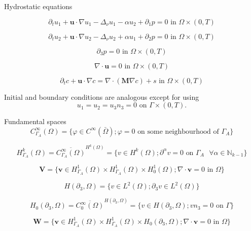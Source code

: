 \documentclass{beamer}
\begin{document}
\begin{frame}{Hydrostatic equations}

$$\partial_t u_1 + \mathbf{u} \cdot \nabla u_1 - \Delta_\nu u_1 - \alpha u_2 + \partial_1 p = 0 \text{ in } \Omega \times (0,T) $$

$$ \partial_t u_2 + \mathbf{u} \cdot \nabla u_2 - \Delta_\nu u_2 + \alpha u_1 + \partial_2 p = 0 \text{ in } \Omega \times (0,T) $$

$$ \partial_3 p = 0 \text{ in } \Omega \times (0,T) $$

$$ \nabla \cdot \mathbf{u} = 0 \text{ in } \Omega \times (0,T) $$

$$ \partial_t c + \mathbf{u} \cdot \nabla c = \nabla \cdot (\mathbf{M} \nabla c) + s \text{ in } \Omega \times (0,T) $$

Initial and boundary conditions are analogous except for using $$ u_1 = u_2 = u_3 n_3 = 0 \text{ on } \Gamma \times (0,T). $$
\end{frame}

\begin{frame}{Fundamental spaces}
\[ C^{\infty}_{\Gamma_A} (\Omega) = \{ \varphi \in C^\infty (\bar{\Omega}); \varphi = 0 \text{ on some neighbourhood of } \Gamma_A \} \]

\[ H^k_{\Gamma_A} (\Omega) = \overline{C_{\Gamma_A} ^ \infty (\Omega)} ^ {H^k (\Omega)} = \{ v \in H^k(\Omega); \partial^\alpha v=0 \text{ on } \Gamma_A \text{ } \forall \alpha \in \mathbb{N}_{k-1} \} \]

\[ \mathbf{V} = \{ \mathbf{v} \in  H^1_{\Gamma_A} (\Omega) \times H^1_{\Gamma_A} (\Omega) \times H^1_0 (\Omega); \nabla \cdot \mathbf{v} = 0 \text{ in } \Omega \} \]

\[ H (\partial_3, \Omega) = \{ v \in L^2(\Omega); \partial_3 v \in L^2 (\Omega)\} \]

\[ H_0 (\partial_3, \Omega) = \overline{C_0 ^\infty (\Omega)}^{H (\partial_3, \Omega)} = \{ v \in H(\partial_3, \Omega); v n_3 = 0 \text{ on } \Gamma \} \]

\[ \mathbf{W} = \{ \mathbf{v} \in  H^1_{\Gamma_A} (\Omega) \times H^1_{\Gamma_A} (\Omega) \times H_0 (\partial_3, \Omega); \nabla \cdot \mathbf{v} = 0 \text{ in } \Omega \} \]
\end{frame}
\end{document}

